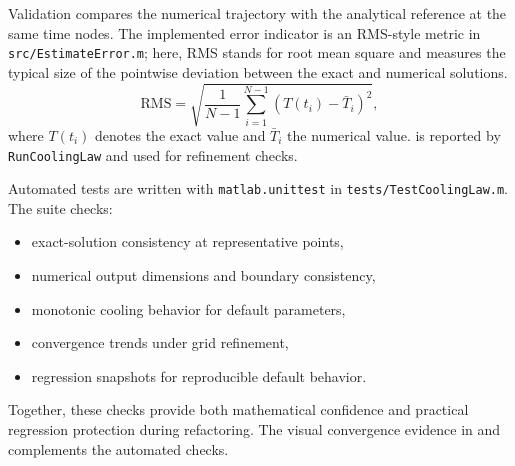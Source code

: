 Validation compares the numerical trajectory with the analytical reference at
the same time nodes. The implemented error indicator is an RMS-style metric in
\texttt{src/EstimateError.m}; here, RMS stands for root mean square and measures
the typical size of the pointwise deviation between the exact and numerical
solutions.
\begin{equation}
\mathrm{RMS}
= \sqrt{\frac{1}{N-1}\sum_{i=1}^{N-1}\left(T(t_i)-\bar{T}_i\right)^2},
\label{eq:rms-error}
\end{equation}
where $T(t_i)$ denotes the exact value and $\bar{T}_i$ the numerical value.
 is reported by \texttt{RunCoolingLaw} and used
for refinement checks.

Automated tests are written with \texttt{matlab.unittest} in
\texttt{tests/TestCoolingLaw.m}. The suite checks:
\begin{itemize}
\item exact-solution consistency at representative points,
\item numerical output dimensions and boundary consistency,
\item monotonic cooling behavior for default parameters,
\item convergence trends under grid refinement,
\item regression snapshots for reproducible default behavior.
\end{itemize}

Together, these checks provide both mathematical confidence and practical
regression protection during refactoring. The visual convergence evidence in
 and 
complements the automated checks.
